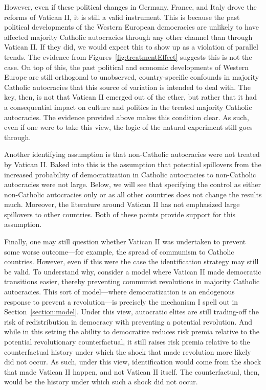 However, even if these political changes in Germany, France, and Italy drove the reforms of Vatican II, it is still a valid instrument. This is because the past political developments of the Western European democracies are unlikely to have affected majority Catholic autocracies through any other channel than through Vatican II. If they did, we would expect this to show up as a violation of parallel trends. The evidence from Figures~\ref{fig:treatmentEffect} suggests this is not the case. On top of this, the past political and economic developments of Western Europe are still orthogonal to unobserved, country-specific confounds in majority Catholic autocracies that this source of variation is intended to deal with. The key, then, is not that Vatican II emerged out of the ether, but rather that it had a consequential impact on culture and politics in the treated majority Catholic autocracies. The evidence provided above makes this condition clear. As such, even if one were to take this view, the logic of the natural experiment still goes through.

\label{par:acknowledge_other_country}
Another identifying assumption is that non-Catholic autocracies were not treated by Vatican II. Baked into this is the assumption that potential spillovers from the increased probability of democratization in Catholic autocracies to non-Catholic autocracies were not large. Below, we will see that specifying the control as either non-Catholic autocracies only or as all other countries does not change the results much. Moreover, the literature around Vatican II has not emphasized large spillovers to other countries. Both of these points provide support for this assumption.

\label{par:acknowledge_counter_history}
Finally, one may still question whether Vatican II was undertaken to prevent some worse outcome---for example, the spread of communism to Catholic countries. However, even if this were the case the identification strategy may still be valid. To understand why, consider a model where Vatican II made democratic transitions easier, thereby preventing communist revolutions in majority Catholic autocracies. This sort of model---where democratization is an endogenous response to prevent a revolution---is precisely the mechanism I spell out in Section~\ref{section:model}. Under this view, autocratic elites are still trading-off the risk of redistribution in democracy with preventing a potential revolution. And while in this setting the ability to democratize reduces risk premia relative to the potential revolutionary counterfactual, it still raises risk premia relative to the counterfactual history under which the shock that made revolution more likely did not occur. As such, under this view, identification would come from the shock that made Vatican II happen, and not Vatican II itself.  The counterfactual, then, would be the history under which such a shock did not occur.

